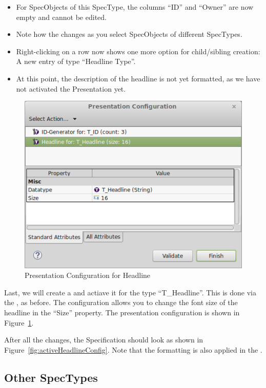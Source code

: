 \begin{itemize}
\item
  For SpecObjects of this SpecType, the columns ``ID'' and ``Owner'' are now empty and cannot be edited.
\item
  Note how the  changes as you select SpecObjects of different SpecTypes.
\item
  Right-clicking on a row now shows one more option for child/sibling creation: A new entry of type ``Headline Type''.
\item At this point, the description of the headline is not yet formatted, as we have not activated the Presentation yet.
\end{itemize}

\begin{figure}
\centering      
\includegraphics[width=0.8\linewidth]{../rmf-images/Presentation_headline.png}      
\caption{Presentation Configuration for Headline}      
\label{fig:headlineConfig2}
\end{figure}

Last, we will create a  and actiave it for the type ``T\_Headline''.  This is done via the , as before.  The configuration allows you to change the font size of the headline in the ``Size'' property.  The presentation configuration is shown in Figure~\ref{fig:headlineConfig2}.

After all the changes, the Specification should look as shown in Figure~\ref{fig:activeHeadlineConfig}.  Note that the formatting is also applied in the .

\subsection{Other SpecTypes}


